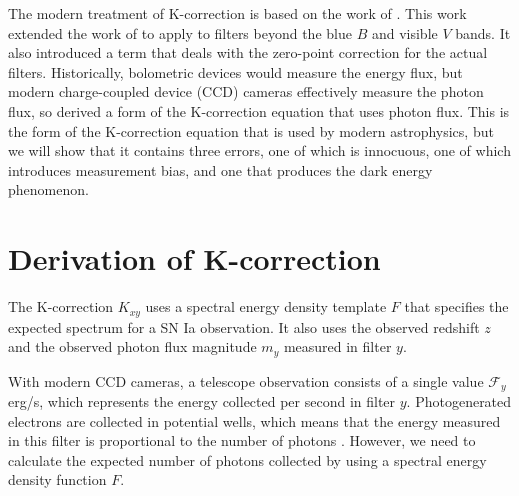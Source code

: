 \documentclass[aps,prl,reprint,amsmath,floatfix]{revtex4-2}
\begin{document}
The modern treatment of K-correction is based on the work of \citet{kim1996}.
This work extended the work of \citet{oke1968} to apply to filters beyond the
blue $B$ and visible $V$ bands. It also introduced a term that deals with the
zero-point correction for the actual filters. Historically, bolometric devices
would measure the energy flux, but modern charge-coupled device (CCD) cameras
effectively measure the photon flux, so \citet{kim1996} derived a form of the
K-correction equation that uses photon flux. This is the form of the
K-correction equation that is used by modern astrophysics, but we will show
that it contains three errors, one of which is innocuous, one of which
introduces measurement bias, and one that produces the dark energy phenomenon.

\section{Derivation of K-correction}

The K-correction $K_{xy}$ uses a spectral energy density template $F$ that
specifies the expected spectrum for a SN Ia observation. It also uses the
observed redshift $z$ and the observed photon flux magnitude $m_y$ measured in
filter $y$.

With modern CCD cameras, a telescope observation consists of a single value
$\mathcal{F}_y$ erg/s, which represents the energy collected per second in
filter $y$. Photogenerated electrons are collected in potential wells, which
means that the energy measured in this filter is proportional to the number of
photons \citep{lesser2015}. However, we need to calculate the expected number
of photons collected by using a spectral energy density function $F$.
\end{document}
